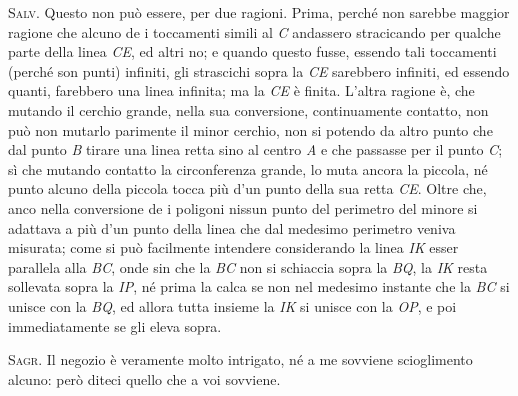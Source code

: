 \documentclass[11pt,twoside,openany]{book}
\newcommand{\speaker}[1]{\textcolor{rubric}{\textsc{#1}}\space}
\begin{document}
\speaker{Salv.} Questo non può essere, per due ragioni. Prima, perché non sarebbe maggior ragione che alcuno de i toccamenti simili al \emph{C} andassero stracicando per qualche parte della linea \emph{CE}, ed altri no; e quando questo fusse, essendo tali toccamenti (perché son punti) infiniti, gli strascichi sopra la \emph{CE} sarebbero infiniti, ed essendo quanti, farebbero una linea infinita; ma la \emph{CE} è finita. L'altra ragione è, che mutando il cerchio grande, nella sua conversione, continuamente contatto, non può non mutarlo parimente il minor cerchio, non si potendo da altro punto che dal punto \emph{B} tirare una linea retta sino al centro \emph{A} e che passasse per il punto \emph{C}; sì che mutando contatto la circonferenza grande, lo muta ancora la piccola, né punto alcuno della piccola tocca più d'un punto della sua retta \emph{CE}. Oltre che, anco nella conversione de i poligoni nissun punto del perimetro del minore si adattava a più d'un punto della linea che dal medesimo perimetro veniva misurata; come si può facilmente intendere considerando la linea \emph{IK} esser parallela alla \emph{BC}, onde sin che la \emph{BC} non si schiaccia sopra la \emph{BQ}, la \emph{IK} resta sollevata sopra la \emph{IP}, né prima la calca se non nel medesimo instante che la \emph{BC} si unisce con la \emph{BQ}, ed allora tutta insieme la \emph{IK} si unisce con la \emph{OP}, e poi immediatamente se gli eleva sopra.

\speaker{Sagr.} Il negozio è veramente molto intrigato, né a me sovviene scioglimento alcuno: però diteci quello che a voi sovviene.
\end{document}
